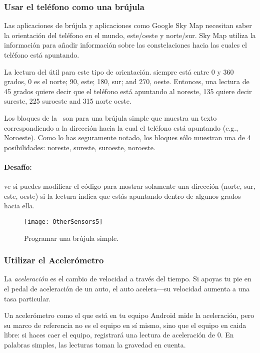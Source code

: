 \subsubsection*{Usar el teléfono como una brújula}

Las aplicaciones de brújula y aplicaciones como Google Sky Map
necesitan saber la orientación del teléfono en el mundo, este/oeste y
norte/sur.  Sky Map utiliza la información para añadir información
sobre las constelaciones hacia las cuales el teléfono está apuntando.

La lectura del  útil para este tipo de
orientación.  siempre está entre 0 y 360 grados, 0 es
el norte; 90, este; 180, sur; and 270, oeste. Entonces, una lectura de
45 grados quiere decir que el teléfono está apuntando al noreste, 135
quiere decir sureste, 225 suroeste and 315 norte oeste.

Los bloques de la~ son para una brújula simple
que muestra un texto correspondiendo a la dirección hacia la cual el
teléfono está apuntando (e.g., Noroeste). Como lo has seguramente
notado, los bloques sólo muestran una de 4 posibilidades: noreste,
sureste, suroeste, noroeste.

\paragraph{Desafío:} ve si puedes modificar el código para mostrar
solamente una dirección (norte, sur, este, oeste) si la lectura indica
que estás apuntando dentro de algunos grados hacia ella.

\begin{figure}[H]
\centering
\texttt{[image: OtherSensors5]}
\caption{Programar una brújula simple.}
\label{fig:OtherSensors5}
\end{figure}

\subsubsection*{Utilizar el Acelerómetro}

La \emph{aceleración} es el cambio de velocidad a través del
tiempo. Si apoyas tu pie en el pedal de aceleración de un auto, el
auto acelera---su velocidad aumenta a una tasa particular.

Un acelerómetro como el que está en tu equipo Android mide la
aceleración, pero su marco de referencia no es el equipo en sí mismo,
sino que el equipo en caida libre: si haces caer el equipo, registrará
una lectura de aceleración de 0. En palabras simples, las lecturas
toman la gravedad en cuenta.

